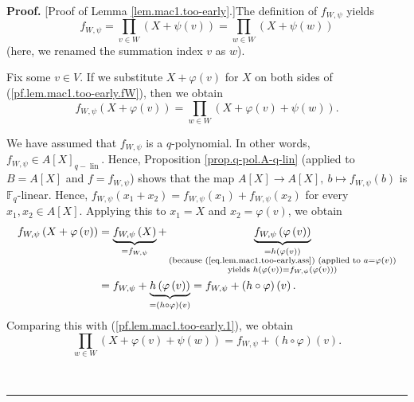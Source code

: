 \documentclass[numbers=enddot,12pt,final,onecolumn,notitlepage]{scrartcl}%
\theoremstyle{definition}
\newenvironment{proof}[1][Proof]{\noindent\textbf{#1.} }{\ \rule{0.5em}{0.5em}}
\let\prodnonlimits\prod
\renewcommand{\prod}{\prodnonlimits\limits}
\begin{document}
\begin{proof}
[Proof of Lemma \ref{lem.mac1.too-early}.]The definition of $f_{W,\psi}$
yields%
\begin{equation}
f_{W,\psi}=\prod_{v\in W}\left(  X+\psi\left(  v\right)  \right)  =\prod_{w\in
W}\left(  X+\psi\left(  w\right)  \right)  \label{pf.lem.mac1.too-early.fW}%
\end{equation}
(here, we renamed the summation index $v$ as $w$).

Fix some $v\in V$. If we substitute $X+\varphi\left(  v\right)  $ for $X$ on
both sides of (\ref{pf.lem.mac1.too-early.fW}), then we obtain%
\begin{equation}
f_{W,\psi}\left(  X+\varphi\left(  v\right)  \right)  =\prod_{w\in W}\left(
X+\varphi\left(  v\right)  +\psi\left(  w\right)  \right)  .
\label{pf.lem.mac1.too-early.1}%
\end{equation}


We have assumed that $f_{W,\psi}$ is a $q$-polynomial. In other words,
$f_{W,\psi}\in A\left[  X\right]  _{q-\operatorname*{lin}}$. Hence,
Proposition \ref{prop.q-pol.A-q-lin} (applied to $B=A\left[  X\right]  $ and
$f=f_{W,\psi}$) shows that the map $A\left[  X\right]  \rightarrow A\left[
X\right]  ,\ b\mapsto f_{W,\psi}\left(  b\right)  $ is $\mathbb{F}_{q}%
$-linear. Hence, $f_{W,\psi}\left(  x_{1}+x_{2}\right)  =f_{W,\psi}\left(
x_{1}\right)  +f_{W,\psi}\left(  x_{2}\right)  $ for every $x_{1},x_{2}\in
A\left[  X\right]  $. Applying this to $x_{1}=X$ and $x_{2}=\varphi\left(
v\right)  $, we obtain
\begin{align*}
f_{W,\psi}\left(  X+\varphi\left(  v\right)  \right)   &
=\underbrace{f_{W,\psi}\left(  X\right)  }_{=f_{W,\psi}}+\underbrace{f_{W,\psi
}\left(  \varphi\left(  v\right)  \right)  }_{\substack{=h\left(
\varphi\left(  v\right)  \right)  \\\text{(because
(\ref{eq.lem.mac1.too-early.ass}) (applied to }a=\varphi\left(  v\right)
\text{)}\\\text{yields }h\left(  \varphi\left(  v\right)  \right)  =f_{W,\psi
}\left(  \varphi\left(  v\right)  \right)  \text{)}}}\\
&  =f_{W,\psi}+\underbrace{h\left(  \varphi\left(  v\right)  \right)
}_{=\left(  h\circ\varphi\right)  \left(  v\right)  }=f_{W,\psi}+\left(
h\circ\varphi\right)  \left(  v\right)  .
\end{align*}
Comparing this with (\ref{pf.lem.mac1.too-early.1}), we obtain%
\begin{equation}
\prod_{w\in W}\left(  X+\varphi\left(  v\right)  +\psi\left(  w\right)
\right)  =f_{W,\psi}+\left(  h\circ\varphi\right)  \left(  v\right)  .
\label{pf.lem.mac1.too-early.4}%
\end{equation}



\end{proof}
\end{document}
